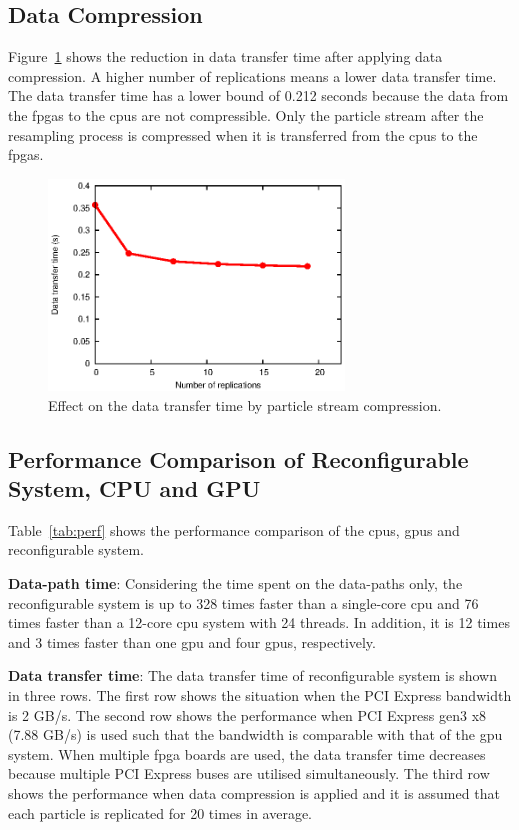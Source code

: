 \subsection{Data Compression}
Figure~\ref{fig:compression} shows the reduction in data transfer time after applying data compression.
A higher number of replications means a lower data transfer time.
The data transfer time has a lower bound of 0.212 seconds because the data from the \glspl{fpga} to the \glspl{cpu} are not compressible.
Only the particle stream after the resampling process is compressed when it is transferred from the \glspl{cpu} to the \glspl{fpga}.

\begin{figure}[t!]
\centering
\includegraphics[width=0.7\textwidth]{4_adaptation/figures/fig_compression}
\caption{Effect on the data transfer time by particle stream compression.}
\label{fig:compression}
\end{figure}

\subsection{Performance Comparison of Reconfigurable System, CPU and GPU}
Table~\ref{tab:perf} shows the performance comparison of the \glspl{cpu}, \gls{gpu}s and reconfigurable system.

\textbf{Data-path time}: Considering the time spent on the data-paths only, the reconfigurable system is up to 328 times faster than a single-core \gls{cpu} and 76 times faster than a 12-core \gls{cpu} system with 24 threads.
In addition, it is 12 times and 3 times faster than one \gls{gpu} and four \gls{gpu}s, respectively.

\textbf{Data transfer time}: The data transfer time of reconfigurable system is shown in three rows.
The first row shows the situation when the PCI Express bandwidth is 2 GB/s.
The second row shows the performance when PCI Express gen3 x8 (7.88 GB/s) is used such that the bandwidth is comparable with that of the \gls{gpu} system.
When multiple \gls{fpga} boards are used, the data transfer time decreases because multiple PCI Express buses are utilised simultaneously.
The third row shows the performance when data compression is applied and it is assumed that each particle is replicated for 20 times in average.


